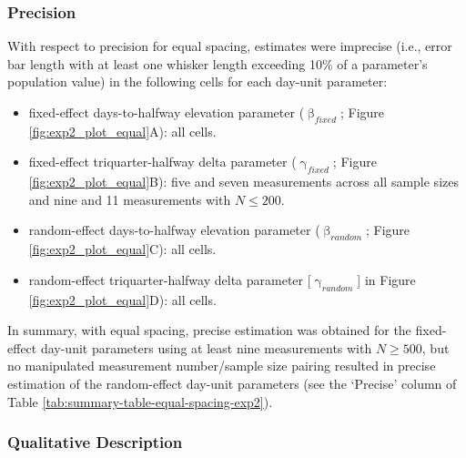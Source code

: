 \documentclass[
12pt, %
twoside,
english]{guelphthesis}
\begin{document}
\hypertarget{precision-equal-exp2}{%
\subsubsection{Precision}\label{precision-equal-exp2}}

With respect to precision for equal spacing, estimates were imprecise (i.e., error bar length with at least one whisker length exceeding 10\% of a parameter's population value) in the following cells for each day-unit parameter:
\begin{itemize}
\tightlist
\item
  fixed-effect days-to-halfway elevation parameter (\(\upbeta_{fixed}\); Figure \ref{fig:exp2_plot_equal}A): all cells.
\item
  fixed-effect triquarter-halfway delta parameter (\(\upgamma_{fixed}\); Figure \ref{fig:exp2_plot_equal}B): five and seven measurements across all sample sizes and nine and 11 measurements with \(N \le 200\).
\item
  random-effect days-to-halfway elevation parameter (\(\upbeta_{random}\); Figure \ref{fig:exp2_plot_equal}C): all cells.
\item
  random-effect triquarter-halfway delta parameter {[}\(\upgamma_{random}\){]} in Figure \ref{fig:exp2_plot_equal}D): all cells.
\end{itemize}
In summary, with equal spacing, precise estimation was obtained for the fixed-effect day-unit parameters using at least nine measurements with \(N \ge 500\), but no manipulated measurement number/sample size pairing resulted in precise estimation of the random-effect day-unit parameters (see the `Precise' column of Table \ref{tab:summary-table-equal-spacing-exp2}).

\hypertarget{qualitative-equal-exp2}{%
\subsubsection{Qualitative Description}\label{qualitative-equal-exp2}}
\end{document}
